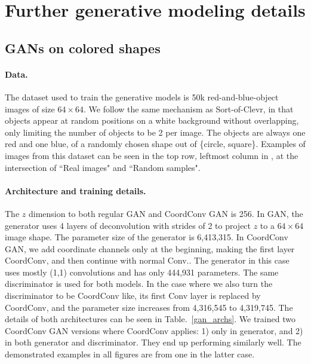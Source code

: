\documentclass{article}
\begin{document}
\begin{comment}
 - , conv, coordconv
val loss: 0.6271, 0.3383
val box loss: 0.1003, 0.0854
val score loss: 0.5270, 0.2526
val box iou train: 0.6388, 0.6612
val box iou nms mean: 0.1508, 0.1868
val box iou nms argmax: 0.4965, 0.6359
\end{comment}





\section{Further generative modeling details}

\subsection{GANs on colored shapes}

\paragraph{Data.} The dataset used to train the generative models is 50k red-and-blue-object images of size $64\times64$. We follow the same mechanism as Sort-of-Clevr, in that objects appear at random positions on a white background without overlapping, only limiting the number of objects to be 2 per image. The objects are always one red and one blue, of a randomly chosen shape out of \{circle, square\}. Examples of images from this dataset can be seen in the top row, leftmost column in , at the intersection of ``Real images" and  ``Random samples".

\paragraph{Architecture and training details.} The $z$ dimension to both regular GAN and CoordConv GAN is 256. In GAN, the generator uses 4 layers of deconvolution with strides of 2 to project $z$ to a $64\times64$ image shape. The parameter size of the generator is 6,413,315. In CoordConv GAN, we add coordinate channels only at the beginning, making the first layer CoordConv, and then continue with normal Conv.. The generator in this case uses mostly (1,1) convolutions and has only 444,931 parameters. The same discriminator is used for both models. In the case where we also turn the discriminator to be CoordConv like, its first Conv layer is replaced by CoordConv, and the parameter size increases from 4,316,545 to 4,319,745. The details of both architectures can be seen in Table.~\ref{gan_archs}. We trained two CoordConv GAN versions where CoordConv applies: 1) only in generator, and 2) in both generator and discriminator. They end up performing similarly well. The demonstrated examples in all figures are from one in the latter case.
\end{document}
